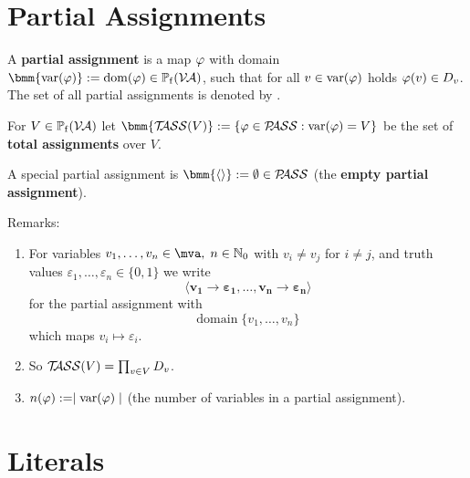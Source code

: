\documentclass[12pt]{book}
\begin{document}
\section{Partial Assignments}
\label{sec:Partialassignments}

\begin{defi}\label{def:Pass}
      A \textbf{partial assignment} is a map $\varphi$ with domain $\bmm{\var(\vp)} := \dom(\vp) \in \pote(\Va)$, such that for all $v \in \operatorname{var}(\varphi)$ holds $\varphi(v) \in D_v$. 
	  The set of all partial assignments is denoted by \bmm{\Pass}.

      For $V \in \operatorname{\mathbb{P}_f}(\mathcal{V\hspace{-0.1em}A})$ let $\bmm{\Tass(V)} := \set{\vp \in \Pass : \var(\vp) = V}$ be the set of \textbf{total assignments} over $V$.

      A special partial assignment is $\bmm{\epa} := \es \in \Pass$ (the \textbf{empty partial assignment}).
\end{defi}
Remarks:
\begin{enumerate}
      \item For variables $v_1, \ldots, v_n \in \mva, \; n\in \mathbb{N}_0$ with $v_i \neq v_j$ for $i\neq j$, and truth values $\varepsilon_1, \ldots, \varepsilon_n \in \{0,1\}$ we write
      \begin{displaymath}
            \pmb{\langle v_1 \to \varepsilon_1, \ldots, v_n \to \varepsilon_n\rangle}
      \end{displaymath}
      for the partial assignment with
      \begin{displaymath}
            \mbox{domain} \; \{v_1, \ldots, v_n\}
      \end{displaymath}
      which maps $v_i \mapsto \varepsilon_i$.
      \item So $\mathcal{T\hspace{-0.35em}ASS}(V) = \prod_{v \in V} D_v$.
      \item $n(\varphi) := \mid \operatorname{var}(\varphi) \mid$ (the number of variables in a partial assignment).
\end{enumerate}

\section{Literals}
\label{sec:Litsvar}
\end{document}
